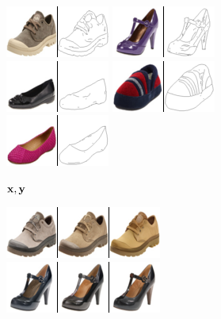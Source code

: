   \begin{figure}[t]
    \centering
    \begin{subfigure}[t]{0.2\textwidth}
      \centering
      \includegraphics[height=\edgesstuffimgheight]{figs/cigcvae/image-samples/shoes/image_aipo_0_imagenet_gt_masked.png}
      \includegraphics[height=\edgesstuffimgheight]{figs/cigcvae/image-samples/shoes/image_aipo_1_imagenet_gt_masked.png}
      \includegraphics[height=\edgesstuffimgheight]{figs/cigcvae/image-samples/shoes/image_aipo_2_imagenet_gt_masked.png}
      \includegraphics[height=\edgesstuffimgheight]{figs/cigcvae/image-samples/shoes/image_aipo_3_imagenet_gt_masked.png}
      \includegraphics[height=\edgesstuffimgheight]{figs/cigcvae/image-samples/shoes/image_aipo_4_imagenet_gt_masked.png}
      \caption{${\mathbf{x}}, {\mathbf{y}}$}
    \end{subfigure}
    \begin{subfigure}[t]{0.25\textwidth}
      \centering
      \includegraphics[height=\edgesstuffimgheight]{figs/cigcvae/image-samples/shoes/image_aipo_0_t=0.85_imagenet_samples.png}
      \includegraphics[height=\edgesstuffimgheight]{figs/cigcvae/image-samples/shoes/image_aipo_1_t=0.85_imagenet_samples.png}

\end{subfigure}
\end{figure}
